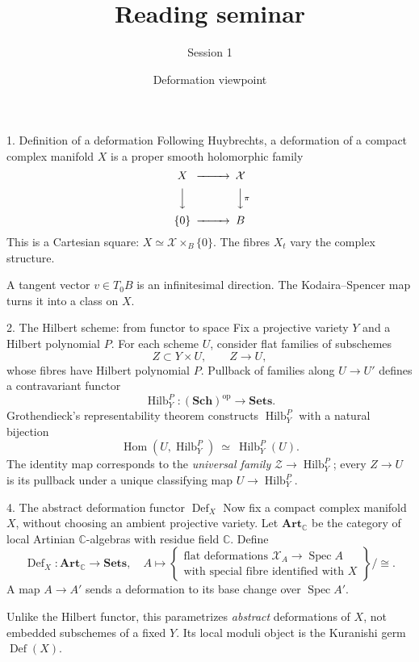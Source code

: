 \documentclass[aspectratio=169]{beamer}
\title{Reading seminar}
\subtitle{Session 1}
\date{Deformation viewpoint}
\begin{document}
\begin{frame}\titlepage\end{frame}
\begin{frame}{1. Definition of a deformation}
Following Huybrechts, a deformation of a compact complex
manifold $X$ is a proper smooth holomorphic family
\[
\begin{CD}
X @>>> \mathcal X\\
@VVV @VV{\pi}V\\
\{0\} @>>> B
\end{CD}
\]
This is a Cartesian square: $X\simeq\mathcal X\times_B\{0\}$.
The fibres $X_t$ vary the complex structure.

A tangent vector $v\in T_0B$ is an infinitesimal direction.
The Kodaira--Spencer map turns it into a class on $X$.
\end{frame}

\begin{frame}{2. The Hilbert scheme: from functor to space}
\small
Fix a projective variety $Y$ and a Hilbert polynomial $P$.
For each scheme $U$, consider flat families of subschemes
\[
Z\subset Y\times U,\qquad Z\longrightarrow U,
\]
whose fibres have Hilbert polynomial $P$. Pullback of families
along $U\to U'$ defines a contravariant functor
\[
\operatorname{Hilb}_Y^P:(\mathbf{Sch})^{\mathrm{op}}\to\mathbf{Sets}.
\]
Grothendieck's representability theorem constructs
$\operatorname{Hilb}_Y^P$ with a natural bijection
\[
\operatorname{Hom}(U,\operatorname{Hilb}_Y^P)
\ \simeq\ \operatorname{Hilb}_Y^P(U).
\]
The identity map corresponds to the \emph{universal family}
$\mathcal Z\to\operatorname{Hilb}_Y^P$; every $Z\to U$ is
its pullback under a unique classifying map
$U\to\operatorname{Hilb}_Y^P$.
\end{frame}

\begin{frame}{4. The abstract deformation functor $\operatorname{Def}_X$}
\small
Now fix a compact complex manifold $X$, without
choosing an ambient projective variety.
Let $\mathbf{Art}_{\mathbb C}$ be the category of local
Artinian $\mathbb C$-algebras with residue field $\mathbb C$.
Define
\[
\operatorname{Def}_X:\mathbf{Art}_{\mathbb C}\to\mathbf{Sets},
\quad
A\longmapsto
\left\{
\begin{array}{c}
\text{flat deformations }\mathcal X_A\to\operatorname{Spec}A\\
\text{with special fibre identified with }X
\end{array}\right\}\big/\cong.
\]
A map $A\to A'$ sends a deformation to its base change
over $\operatorname{Spec}A'$.

\medskip
Unlike the Hilbert functor, this parametrizes
\emph{abstract} deformations of $X$, not embedded
subschemes of a fixed $Y$. Its local moduli object is
the Kuranishi germ $\operatorname{Def}(X)$.
\end{frame}
\end{document}
